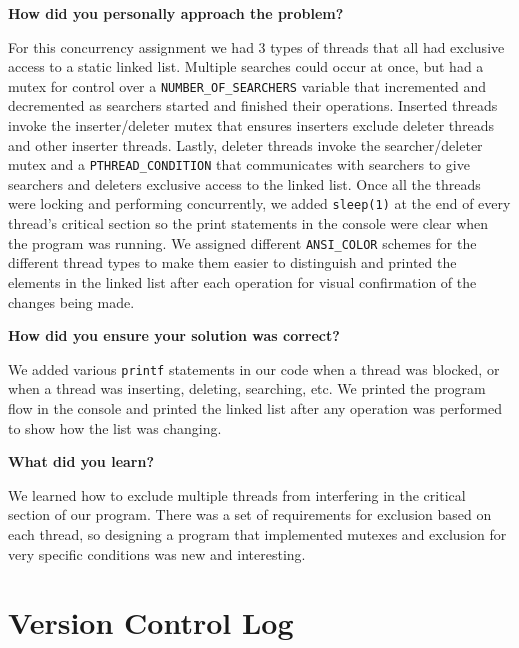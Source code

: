 \documentclass[10pt,letterpaper,draftclsnofoot,onecolumn]{IEEEtran}
\begin{document}
\bigskip

\noindent\textbf{How did you personally approach the problem?}
\medskip

\medskip

\noindent For this concurrency assignment we had 3 types of threads that all had exclusive access to a static linked list. Multiple searches could occur at once, but had a mutex for control over a \texttt{NUMBER\_OF\_SEARCHERS} variable that incremented and decremented as searchers started and finished their operations. Inserted threads invoke the inserter/deleter mutex that ensures inserters exclude deleter threads and other inserter threads. Lastly, deleter threads invoke the searcher/deleter mutex and a \texttt{PTHREAD\_CONDITION} that communicates with searchers to give searchers and deleters exclusive access to the linked list. Once all the threads were locking and performing concurrently, we added \texttt{sleep(1)} at the end of every thread's critical section so the print statements in the console were clear when the program was running. We assigned different \texttt{ANSI\_COLOR} schemes for the different thread types to make them easier to distinguish and printed the elements in the linked list after each operation for visual confirmation of the changes being made.

\bigskip

\noindent\textbf{How did you ensure your solution was correct?}
\medskip

\medskip

\noindent We added various \texttt{printf} statements in our code when a thread was blocked, or when a thread was inserting, deleting, searching, etc. We printed the program flow in the console and printed the linked list after any operation was performed to show how the list was changing.
\bigskip

\noindent\textbf{What did you learn?}
\medskip

\medskip

\noindent We learned how to exclude multiple threads from interfering in the critical section of our program. There was a set of requirements for exclusion based on each thread, so designing a program that implemented mutexes and exclusion for very specific conditions was new and interesting.  
\medskip


\section{Version Control Log}
\bigskip
\end{document}
